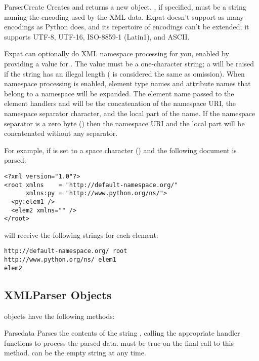 \begin{funcdesc}{ParserCreate}{}
Creates and returns a new  object.  
, if specified, must be a string naming the encoding 
used by the XML data.  Expat doesn't support as many encodings as
Python does, and its repertoire of encodings can't be extended; it
supports UTF-8, UTF-16, ISO-8859-1 (Latin1), and ASCII.  

Expat can optionally do XML namespace processing for you, enabled by
providing a value for .  The value must be a
one-character string; a  will be raised if the
string has an illegal length ( is considered the same as
omission).  When namespace processing is enabled, element type names
and attribute names that belong to a namespace will be expanded.  The
element name passed to the element handlers
 and 
will be the concatenation of the namespace URI, the namespace
separator character, and the local part of the name.  If the namespace
separator is a zero byte () then the namespace URI and
the local part will be concatenated without any separator. 

For example, if  is set to a space character
(\character{ }) and the following document is parsed:

\begin{verbatim}
<?xml version="1.0"?>
<root xmlns    = "http://default-namespace.org/"
      xmlns:py = "http://www.python.org/ns/">
  <py:elem1 />
  <elem2 xmlns="" />
</root>
\end{verbatim}

 will receive the following strings
for each element:

\begin{verbatim}
http://default-namespace.org/ root
http://www.python.org/ns/ elem1
elem2
\end{verbatim}
\end{funcdesc}


\subsection{XMLParser Objects \label{xmlparser-objects}}

 objects have the following methods:

\begin{methoddesc}[xmlparser]{Parse}{data}
Parses the contents of the string , calling the appropriate
handler functions to process the parsed data.   must be
true on the final call to this method.   can be the empty
string at any time.
\end{methoddesc}

